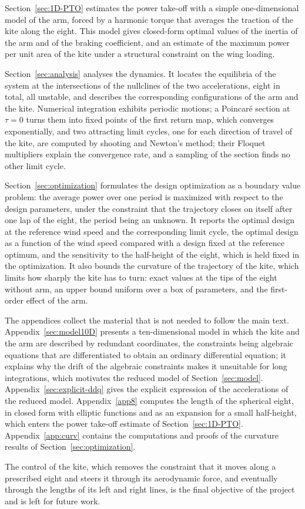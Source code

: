 Section~\ref{sec:1D-PTO} estimates the power take-off with a simple one-dimensional model of the arm, forced by a harmonic torque that averages the traction of the kite along the eight.
This model gives closed-form optimal values of the inertia of the arm and of the braking coefficient, and an estimate of the maximum power per unit area of the kite under a structural constraint on the wing loading.

Section~\ref{sec:analysis} analyses the dynamics.
It locates the equilibria of the system at the intersections of the nullclines of the two accelerations, eight in total, all unstable, and describes the corresponding configurations of the arm and the kite.
Numerical integration exhibits periodic motions; a Poincaré section at \(\tau=0\) turns them into fixed points of the first return map, which converges exponentially, and two attracting limit cycles, one for each direction of travel of the kite, are computed by shooting and Newton's method; their Floquet multipliers explain the convergence rate, and a sampling of the section finds no other limit cycle.

Section~\ref{sec:optimization} formulates the design optimization as a boundary value problem: the average power over one period is maximized with respect to the design parameters, under the constraint that the trajectory closes on itself after one lap of the eight, the period being an unknown.
It reports the optimal design at the reference wind speed and the corresponding limit cycle, the optimal design as a function of the wind speed compared with a design fixed at the reference optimum, and the sensitivity to the half-height of the eight, which is held fixed in the optimization.
It also bounds the curvature of the trajectory of the kite, which limits how sharply the kite has to turn: exact values at the tips of the eight without arm, an upper bound uniform over a box of parameters, and the first-order effect of the arm.

The appendices collect the material that is not needed to follow the main text.
Appendix~\ref{sec:model10D} presents a ten-dimensional model in which the kite and the arm are described by redundant coordinates, the constraints being algebraic equations that are differentiated to obtain an ordinary differential equation; it explains why the drift of the algebraic constraints makes it unsuitable for long integrations, which motivates the reduced model of Section~\ref{sec:model}.
Appendix~\ref{sec:explicit-ddq} gives the explicit expression of the accelerations of the reduced model.
Appendix~\ref{app8} computes the length of the spherical eight, in closed form with elliptic functions and as an expansion for a small half-height, which enters the power take-off estimate of Section~\ref{sec:1D-PTO}.
Appendix~\ref{app:curv} contains the computations and proofs of the curvature results of Section~\ref{sec:optimization}.

The control of the kite, which removes the constraint that it moves along a prescribed eight and steers it through its aerodynamic force, and eventually through the lengths of its left and right lines, is the final objective of the project \cite{Bavoil2024KEEP} and is left for future work.
